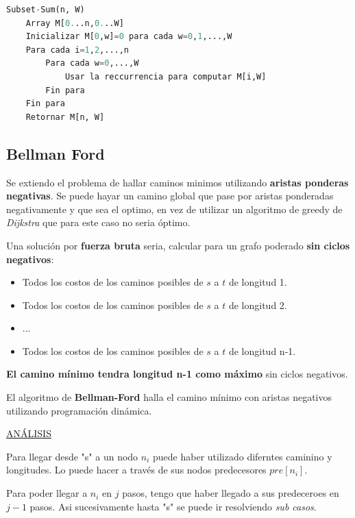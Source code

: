 \documentclass{article}
\begin{document}
\begin{lstlisting}[language=Python, caption=Algoritmo de requeridos con cupos]
Subset-Sum(n, W)
    Array M[0...n,0...W]
    Inicializar M[0,w]=0 para cada w=0,1,...,W
    Para cada i=1,2,...,n
        Para cada w=0,...,W
            Usar la reccurrencia para computar M[i,W]
        Fin para
    Fin para
    Retornar M[n, W]
\end{lstlisting}





\newpage
\subsection{Bellman Ford}

Se extiendo el problema de hallar caminos minimos utilizando \textbf{aristas ponderas negativas}. 
Se puede hayar un camino global que pase por aristas ponderadas negativamente y que sea el optimo, 
en vez de utilizar un algoritmo de greedy de \textit{Dijkstra} que para este caso no seria óptimo.

Una solución por \textbf{fuerza bruta} seria, calcular para un grafo poderado \textbf{sin ciclos negativos}:

\begin{itemize}
    \item Todos los costos de los caminos posibles de \(s\) a \(t\) de longitud 1.
    \item Todos los costos de los caminos posibles de \(s\) a \(t\) de longitud 2.
    \item ...
    \item Todos los costos de los caminos posibles de \(s\) a \(t\) de longitud n-1.
\end{itemize}

\textbf{El camino mínimo tendra longitud n-1 como máximo} sin ciclos negativos.

El algoritmo de \textbf{Bellman-Ford} halla el camino mínimo con aristas negativos utilizando programación dinámica.

\underline{ANÁLISIS}

Para llegar desde "s" a un nodo \(n_i\) puede haber utilizado diferntes caminino y longitudes.
Lo puede hacer a través de sus nodos predecesores \(pre[n_i]\).

Para poder llegar a \(n_i\) en \(j\) pasos, tengo que haber llegado a sus predeceroes en \(j-1\) pasos. 
Asi sucesivamente hasta "s" se puede ir resolviendo \textit{sub casos}.
\end{document}
